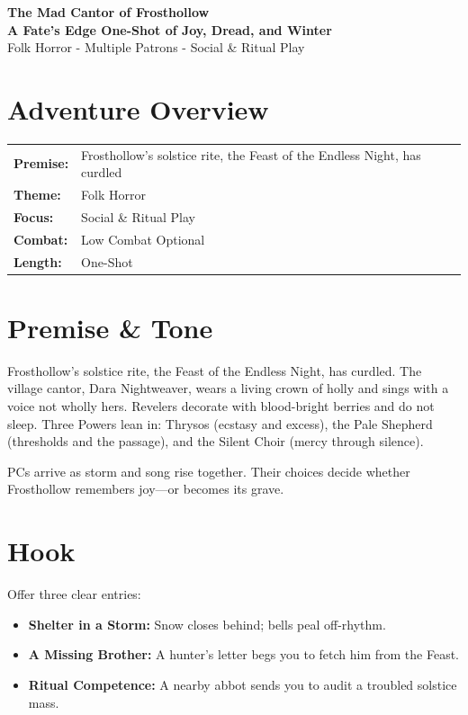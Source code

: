 \documentclass[11pt]{article}
\begin{document}


\begin{center}
    \textbf{\LARGE The Mad Cantor of Frosthollow} \\
    \vspace{0.2cm}
    \textbf{A Fate's Edge One-Shot of Joy, Dread, and Winter} \\
    \vspace{0.1cm}
    \small Folk Horror - Multiple Patrons - Social \& Ritual Play
\end{center}

\section*{Adventure Overview}
\begin{longtable}{@{}ll}
    \textbf{Premise:} & Frosthollow's solstice rite, the Feast of the Endless Night, has curdled \\
    \textbf{Theme:} & Folk Horror \\
    \textbf{Focus:} & Social \& Ritual Play \\
    \textbf{Combat:} & Low Combat Optional \\
    \textbf{Length:} & One-Shot \\
\end{longtable}

\section*{Premise \& Tone}
Frosthollow's solstice rite, the Feast of the Endless Night, has curdled. The village cantor, Dara Nightweaver, wears a living crown of holly and sings with a voice not wholly hers. Revelers decorate with blood-bright berries and do not sleep. Three Powers lean in: Thrysos (ecstasy and excess), the Pale Shepherd (thresholds and the passage), and the Silent Choir (mercy through silence).

PCs arrive as storm and song rise together. Their choices decide whether Frosthollow remembers joy---or becomes its grave.

\section*{Hook}
Offer three clear entries:
\begin{itemize}
    \item \textbf{Shelter in a Storm:} Snow closes behind; bells peal off-rhythm.
    \item \textbf{A Missing Brother:} A hunter's letter begs you to fetch him from the Feast.
    \item \textbf{Ritual Competence:} A nearby abbot sends you to audit a troubled solstice mass.
\end{itemize}
\end{document}
